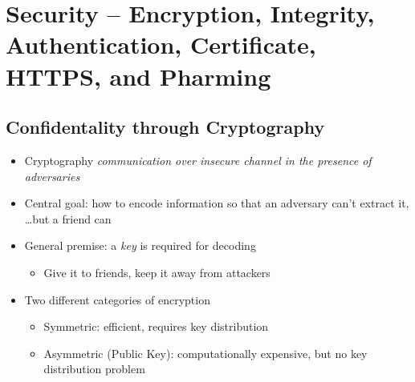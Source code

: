 \section{Security -- Encryption, Integrity, Authentication, Certificate, HTTPS, and Pharming}
\subsection{Confidentality through Cryptography}
\begin{itemize}[nosep]
    \item Cryptography \emph{communication over insecure channel in the presence of adversaries}
    \item Central goal: how to encode information so that an adversary can't extract it, \dots but a friend can
    \item General premise: a \emph{key} is required for decoding
          \begin{itemize}[nosep]
              \item Give it to friends, keep it away from attackers
          \end{itemize}
    \item Two different categories of encryption
          \begin{itemize}[nosep]
              \item Symmetric: efficient, requires key distribution
              \item Asymmetric (Public Key): computationally expensive, but no key distribution problem
          \end{itemize}
\end{itemize}

